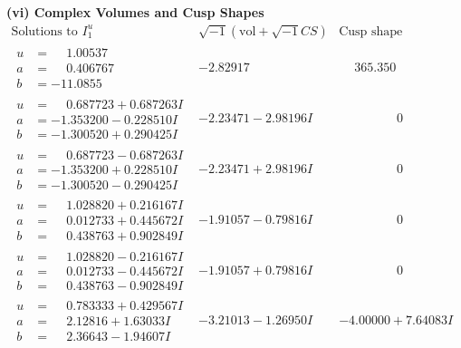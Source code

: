 \documentclass[1p]{elsarticle_modified}
\theoremstyle{definition}
\newcommand{\I}{\sqrt{-1}}
\begin{document}
\newpage\flushleft \textbf{(vi) Complex Volumes and Cusp Shapes}
$$\begin{array}{c|c|c}  
\text{Solutions to }I^u_{1}& \I (\text{vol} + \sqrt{-1}CS) & \text{Cusp shape}\\
 \hline 
\begin{aligned}
u &= \phantom{-}1.00537\phantom{ +0.000000I} \\
a &= \phantom{-}0.406767\phantom{ +0.000000I} \\
b &= -11.0855\phantom{ +0.000000I}\end{aligned}
 & -2.82917\phantom{ +0.000000I} & \phantom{-}365.350\phantom{ +0.000000I} \\ \hline\begin{aligned}
u &= \phantom{-}0.687723 + 0.687263 I \\
a &= -1.353200 - 0.228510 I \\
b &= -1.300520 + 0.290425 I\end{aligned}
 & -2.23471 - 2.98196 I & \phantom{-0.000000 } 0 \\ \hline\begin{aligned}
u &= \phantom{-}0.687723 - 0.687263 I \\
a &= -1.353200 + 0.228510 I \\
b &= -1.300520 - 0.290425 I\end{aligned}
 & -2.23471 + 2.98196 I & \phantom{-0.000000 } 0 \\ \hline\begin{aligned}
u &= \phantom{-}1.028820 + 0.216167 I \\
a &= \phantom{-}0.012733 + 0.445672 I \\
b &= \phantom{-}0.438763 + 0.902849 I\end{aligned}
 & -1.91057 - 0.79816 I & \phantom{-0.000000 } 0 \\ \hline\begin{aligned}
u &= \phantom{-}1.028820 - 0.216167 I \\
a &= \phantom{-}0.012733 - 0.445672 I \\
b &= \phantom{-}0.438763 - 0.902849 I\end{aligned}
 & -1.91057 + 0.79816 I & \phantom{-0.000000 } 0 \\ \hline\begin{aligned}
u &= \phantom{-}0.783333 + 0.429567 I \\
a &= \phantom{-}2.12816 + 1.63033 I \\
b &= \phantom{-}2.36643 - 1.94607 I\end{aligned}
 & -3.21013 - 1.26950 I & -4.00000 + 7.64083 I \\ \hline\begin{aligned}

\end{aligned}
\end{array}$$
\end{document}
